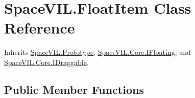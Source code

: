 \hypertarget{class_space_v_i_l_1_1_float_item}{}\section{Space\+V\+I\+L.\+Float\+Item Class Reference}
\label{class_space_v_i_l_1_1_float_item}


Inherits \mbox{\hyperlink{class_space_v_i_l_1_1_prototype}{Space\+V\+I\+L.\+Prototype}}, \mbox{\hyperlink{interface_space_v_i_l_1_1_core_1_1_i_floating}{Space\+V\+I\+L.\+Core.\+I\+Floating}}, and \mbox{\hyperlink{interface_space_v_i_l_1_1_core_1_1_i_draggable}{Space\+V\+I\+L.\+Core.\+I\+Draggable}}.

\subsection*{Public Member Functions}

